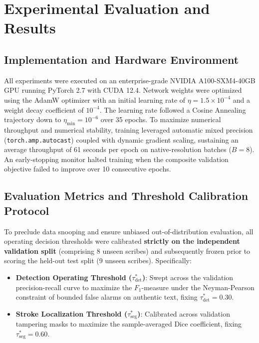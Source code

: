 \documentclass[pdflatex,sn-mathphys-num,iicol]{sn-jnl}
\begin{document}
\section{Experimental Evaluation and Results}\label{sec5}

\subsection{Implementation and Hardware Environment}\label{subsec5_1}
All experiments were executed on an enterprise-grade NVIDIA A100-SXM4-40GB GPU running PyTorch 2.7 with CUDA 12.4. Network weights were optimized using the AdamW optimizer with an initial learning rate of $\eta = 1.5 \times 10^{-4}$ and a weight decay coefficient of $10^{-4}$. The learning rate followed a Cosine Annealing trajectory down to $\eta_{\text{min}} = 10^{-6}$ over 35 epochs. To maximize numerical throughput and numerical stability, training leveraged automatic mixed precision (\texttt{torch.amp.autocast}) coupled with dynamic gradient scaling, sustaining an average throughput of 61 seconds per epoch on native-resolution batches ($B=8$). An early-stopping monitor halted training when the composite validation objective failed to improve over 10 consecutive epochs.

\subsection{Evaluation Metrics and Threshold Calibration Protocol}\label{subsec5_2}
To preclude data snooping and ensure unbiased out-of-distribution evaluation, all operating decision thresholds were calibrated \textbf{strictly on the independent validation split} (comprising 8 unseen scribes) and subsequently frozen prior to scoring the held-out test split (9 unseen scribes). Specifically:
\begin{itemize}
    \item \textbf{Detection Operating Threshold ($\tau_{\text{det}}^*$)}: Swept across the validation precision-recall curve to maximize the $F_1$-measure under the Neyman-Pearson constraint of bounded false alarms on authentic text, fixing $\tau_{\text{det}}^* = 0.30$.
    \item \textbf{Stroke Localization Threshold ($\tau_{\text{seg}}^*$)}: Calibrated across validation tampering masks to maximize the sample-averaged Dice coefficient, fixing $\tau_{\text{seg}}^* = 0.60$.
\end{itemize}
\end{document}
